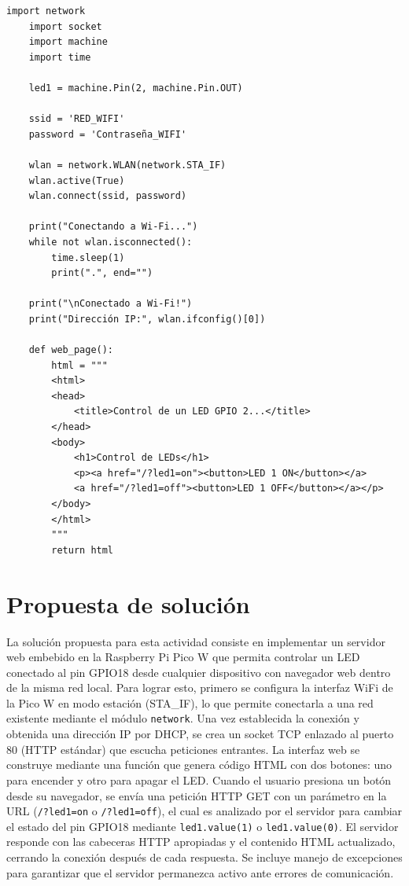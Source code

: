 \documentclass[letterpaper,12pt]{article}
\begin{document}
    \begin{lstlisting}[language={[LAB]Python}]
    import network
    import socket
    import machine
    import time

    led1 = machine.Pin(2, machine.Pin.OUT)

    ssid = 'RED_WIFI'
    password = 'Contraseña_WIFI'

    wlan = network.WLAN(network.STA_IF)
    wlan.active(True)
    wlan.connect(ssid, password)

    print("Conectando a Wi-Fi...")
    while not wlan.isconnected():
        time.sleep(1)
        print(".", end="")

    print("\nConectado a Wi-Fi!")
    print("Dirección IP:", wlan.ifconfig()[0])

    def web_page():
        html = """
        <html>
        <head>
            <title>Control de un LED GPIO 2...</title>
        </head>
        <body>
            <h1>Control de LEDs</h1>
            <p><a href="/?led1=on"><button>LED 1 ON</button></a>
            <a href="/?led1=off"><button>LED 1 OFF</button></a></p>
        </body>
        </html>
        """
        return html
    \end{lstlisting}


    \section*{Propuesta de solución}

    La solución propuesta para esta actividad consiste en implementar un servidor web embebido en la Raspberry Pi Pico W que permita controlar un LED conectado al pin GPIO18 desde cualquier dispositivo con navegador web dentro de la misma red local. Para lograr esto, primero se configura la interfaz WiFi de la Pico W en modo estación (STA\_IF), lo que permite conectarla a una red existente mediante el módulo \texttt{network}. Una vez establecida la conexión y obtenida una dirección IP por DHCP, se crea un socket TCP enlazado al puerto 80 (HTTP estándar) que escucha peticiones entrantes. La interfaz web se construye mediante una función que genera código HTML con dos botones: uno para encender y otro para apagar el LED. Cuando el usuario presiona un botón desde su navegador, se envía una petición HTTP GET con un parámetro en la URL (\texttt{/?led1=on} o \texttt{/?led1=off}), el cual es analizado por el servidor para cambiar el estado del pin GPIO18 mediante \texttt{led1.value(1)} o \texttt{led1.value(0)}. El servidor responde con las cabeceras HTTP apropiadas y el contenido HTML actualizado, cerrando la conexión después de cada respuesta. Se incluye manejo de excepciones para garantizar que el servidor permanezca activo ante errores de comunicación.
\end{document}

